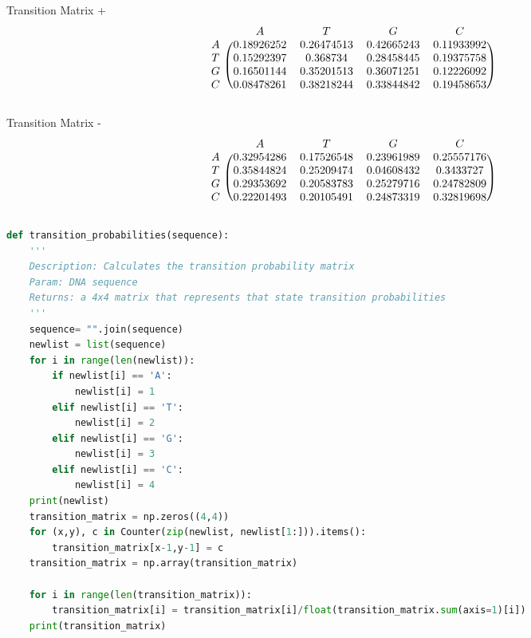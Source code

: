 \documentclass[paper=letter, fontsize=12pt]{article}
\begin{document}
\center Transition Matrix +
\[
\begin{blockarray}{ccccc}
& A & T & G & C \\
\begin{block}{c(cccc)}
  A & 0.18926252 & 0.26474513 & 0.42665243 & 0.11933992 \\
  T & 0.15292397 & 0.368734 & 0.28458445 & 0.19375758  \\
  G & 0.16501144 & 0.35201513 & 0.36071251 & 0.12226092  \\
  C & 0.08478261 & 0.38218244 & 0.33844842 & 0.19458653\\
\end{block}
\end{blockarray}
 \]
 
 \center Transition Matrix -
 \[
\begin{blockarray}{ccccc}
& A & T & G & C \\
\begin{block}{c(cccc)}
  A & 0.32954286 & 0.17526548 & 0.23961989 & 0.25557176 \\
  T & 0.35844824 & 0.25209474 & 0.04608432 & 0.3433727  \\
  G & 0.29353692 & 0.20583783 & 0.25279716 & 0.24782809  \\
  C & 0.22201493 & 0.20105491 & 0.24873319 & 0.32819698\\
\end{block}
\end{blockarray}
 \]
 
\begin{lstlisting}[language=Python]
def transition_probabilities(sequence):
    '''
    Description: Calculates the transition probability matrix
    Param: DNA sequence
    Returns: a 4x4 matrix that represents that state transition probabilities
    '''
    sequence= "".join(sequence)
    newlist = list(sequence)
    for i in range(len(newlist)):
        if newlist[i] == 'A': 
            newlist[i] = 1
        elif newlist[i] == 'T': 
            newlist[i] = 2
        elif newlist[i] == 'G': 
            newlist[i] = 3
        elif newlist[i] == 'C': 
            newlist[i] = 4
    print(newlist)
    transition_matrix = np.zeros((4,4))
    for (x,y), c in Counter(zip(newlist, newlist[1:])).items():
        transition_matrix[x-1,y-1] = c
    transition_matrix = np.array(transition_matrix)

    for i in range(len(transition_matrix)):
        transition_matrix[i] = transition_matrix[i]/float(transition_matrix.sum(axis=1)[i])
    print(transition_matrix)

\end{lstlisting}
\end{document}
